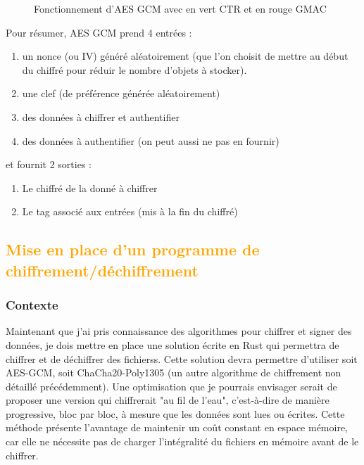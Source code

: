 \documentclass[a4paper, 12pt]{article}
\begin{document}
\begin{figure}[h]
\caption{Fonctionnement d'AES GCM avec en vert CTR et en rouge GMAC}
\label{aesgcm}
\end{figure}


\noindent Pour résumer, AES GCM prend 4 entrées : 
\begin{enumerate}
	\item un nonce (ou IV) généré aléatoirement (que l'on choisit de mettre au début du chiffré pour réduir le nombre d'objets à stocker).
	\item une clef (de préférence générée aléatoirement)
	\item des données à chiffrer et authentifier 
	\item des données à authentifier (on peut aussi ne pas en fournir)
\end{enumerate}
\noindent et fournit 2 sorties :
\begin{enumerate}
	\item Le chiffré de la donné à chiffrer
\item Le tag associé aux entrées (mis à la fin du chiffré)
\end{enumerate}

\subsection{\textcolor{orange}{Mise en place d'un programme de chiffrement/déchiffrement}}
\subsubsection{Contexte}
Maintenant que j'ai pris connaissance des algorithmes pour chiffrer et signer des données, je dois mettre en place une solution écrite en Rust qui permettra de chiffrer et de déchiffrer des fichierss. Cette solution devra permettre d'utiliser soit AES-GCM, soit ChaCha20-Poly1305 (un autre algorithme de chiffrement non détaillé précédemment).
Une optimisation que je pourrais envisager serait de proposer une version qui chiffrerait "au fil de l'eau", c'est-à-dire de manière progressive, bloc par bloc, à mesure que les données sont lues ou écrites. Cette méthode présente l'avantage de maintenir un coût constant en espace mémoire, car elle ne nécessite pas de charger l'intégralité du fichiers en mémoire avant de le chiffrer. \\
\end{document}

